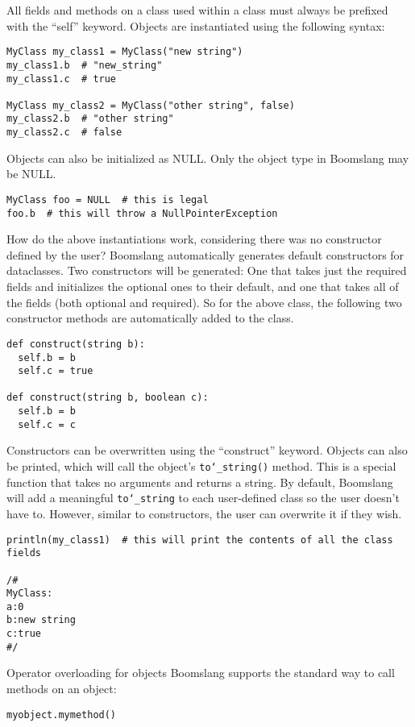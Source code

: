 \documentclass{article}
\begin{document}
All fields and methods on a class used within a class must always be prefixed with the ``self'' keyword. Objects are instantiated using the following syntax:
\begin{verbatim}
MyClass my_class1 = MyClass("new string")
my_class1.b  # "new_string"
my_class1.c  # true

MyClass my_class2 = MyClass("other string", false)
my_class2.b  # "other string"
my_class2.c  # false
\end{verbatim}

Objects can also be initialized as NULL. Only the object type in Boomslang may be NULL.
\begin{verbatim}
MyClass foo = NULL  # this is legal
foo.b  # this will throw a NullPointerException
\end{verbatim}

How do the above instantiations work, considering there was no constructor defined by the user? Boomslang automatically generates default constructors for dataclasses. Two constructors will be generated: One that takes just the required fields and initializes the optional ones to their default, and one that takes all of the fields (both optional and required). So for the above class, the following two constructor methods are automatically added to the class.
\begin{verbatim}
def construct(string b):
  self.b = b
  self.c = true
  
def construct(string b, boolean c):
  self.b = b
  self.c = c
\end{verbatim}

Constructors can be overwritten using the ``construct'' keyword. Objects can also be printed, which will call the object's \texttt{to\char`_string()} method. This is a special function that takes no arguments and returns a string. By default, Boomslang will add a meaningful \texttt{to\char`_string} to each user-defined class so the user doesn't have to. However, similar to constructors, the user can overwrite it if they wish.
\begin{verbatim}
println(my_class1)  # this will print the contents of all the class fields

/#
MyClass:
a:0
b:new string
c:true
#/
\end{verbatim}

Operator overloading for objects
Boomslang supports the standard way to call methods on an object:
\begin{verbatim}
myobject.mymethod()
\end{verbatim}
\end{document}

